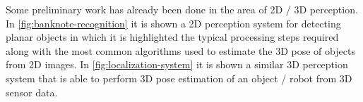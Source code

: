 Some preliminary work has already been done in the area of 2D / 3D perception. In \cref{fig:banknote-recognition} it is shown a 2D perception system for detecting planar objects in which it is highlighted the typical processing steps required along with the most common algorithms used to estimate the 3D pose of objects from 2D images. In \cref{fig:localization-system} it is shown a similar 3D perception system that is able to perform 3D pose estimation of an object / robot from 3D sensor data.


%
%


\clearpage

